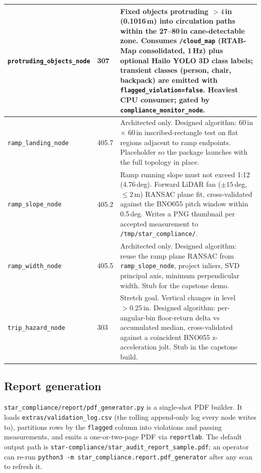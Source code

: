\begin{center}
\begin{tabular}{|p{4.2cm}|p{2.0cm}|p{8.2cm}|}
\hline
\texttt{protruding\_\allowbreak objects\_node}       & 307                & Fixed objects protruding $> 4$\,in (0.1016\,m) into circulation paths within the 27--80\,in cane-detectable zone. Consumes \texttt{/cloud\_map} (RTAB-Map consolidated, 1\,Hz) plus optional Hailo YOLO 3D class labels; transient classes (person, chair, backpack) are emitted with \texttt{flagged\_violation=false}. Heaviest CPU consumer; gated by \texttt{compliance\_monitor\_node}. \\
\hline
\texttt{ramp\_landing\_node}                          & 405.7              & Architected only. Designed algorithm: 60\,in $\times$ 60\,in inscribed-rectangle test on flat regions adjacent to ramp endpoints. Placeholder so the package launches with the full topology in place. \\
\hline
\texttt{ramp\_slope\_node}                            & 405.2              & Ramp running slope must not exceed 1:12 (4.76\,deg). Forward LiDAR fan ($\pm 15$\,deg, $\leq 2$\,m) RANSAC plane fit, cross-validated against the BNO055 pitch window within 0.5\,deg. Writes a PNG thumbnail per accepted measurement to \texttt{/tmp/star\_compliance/}. \\
\hline
\texttt{ramp\_width\_node}                            & 405.5              & Architected only. Designed algorithm: reuse the ramp plane RANSAC from \texttt{ramp\_slope\_node}, project inliers, SVD principal axis, minimum perpendicular width. Stub for the capstone demo. \\
\hline
\texttt{trip\_hazard\_node}                           & 303                & Stretch goal. Vertical changes in level $> 0.25$\,in. Designed algorithm: per-angular-bin floor-return delta vs accumulated median, cross-validated against a coincident BNO055 z-acceleration jolt. Stub in the capstone build. \\
\hline
\end{tabular}
\end{center}

\subsection{Report generation}

\texttt{star\_compliance/report/pdf\_generator.py} is a single-shot
PDF builder. It loads
\texttt{extras/validation\_log.csv} (the rolling append-only log every
node writes to), partitions rows by the \texttt{flagged} column into
violations and passing measurements, and emits a one-or-two-page PDF
via \texttt{reportlab}. The default output path is
\texttt{star-compliance/star\_audit\_report\_sample.pdf}; an operator
can re-run \texttt{python3 -m star\_compliance.report.pdf\_generator}
after any scan to refresh it.

